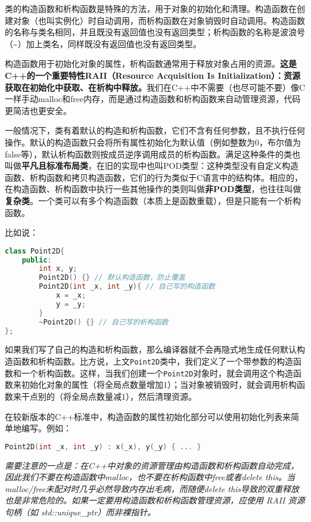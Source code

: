\documentclass[../main.tex]{subfiles}
\begin{document}
类的构造函数和析构函数是特殊的方法，用于对象的初始化和清理。构造函数在创建对象（也叫实例化）时自动调用，而析构函数在对象销毁时自动调用。构造函数的名称与类名相同，并且既没有返回值也没有返回类型；析构函数的名称是波浪号（\textasciitilde）加上类名，同样既没有返回值也没有返回类型。

构造函数用于初始化对象的属性，析构函数通常用于释放对象占用的资源。\textbf{这是C++的一个重要特性RAII（Resource Acquisition Is Initialization）：资源获取在初始化中获取、在析构中释放。}我们在C++中不需要（也尽可能不要）像C一样手动malloc和free内存，而是通过构造函数和析构函数来自动管理资源，代码更简洁也更安全。

一般情况下，类有着默认的构造和析构函数，它们不含有任何参数，且不执行任何操作。默认的构造函数只会将所有属性初始化为默认值（例如整数为0，布尔值为false等），默认析构函数则按成员逆序调用成员的析构函数。满足这种条件的类也叫做\textbf{平凡且标准布局类}，在旧的实现中也叫POD类型：这种类型没有自定义构造函数、析构函数和拷贝构造函数，它们的行为类似于C语言中的结构体。相应的，在构造函数、析构函数中执行一些其他操作的类则叫做\textbf{非POD类型}，也往往叫做\textbf{复杂类}。一个类可以有多个构造函数（本质上是函数重载），但是只能有一个析构函数。

比如说：
\begin{lstlisting}[language=C++]
class Point2D{
    public:
        int x, y;
        Point2D() {} // 默认构造函数，防止覆盖
        Point2D(int _x, int _y){ // 自己写的构造函数
            x = _x;
            y = _y;
        }
        ~Point2D() {} // 自己写的析构函数
};
\end{lstlisting}

如果我们写了自己的构造和析构函数，那么编译器就不会再隐式地生成任何默认构造函数和析构函数。比方说，上文\texttt{Point2D}类中，我们定义了一个带参数的构造函数和一个析构函数。这样，当我们创建一个\texttt{Point2D}对象时，就会调用这个构造函数来初始化对象的属性（将全局点数量增加1）；当对象被销毁时，就会调用析构函数来干点别的（将全局点数量减1），然后清理资源。

在较新版本的C++标准中，构造函数的属性初始化部分可以使用初始化列表来简单地编写。例如：
\begin{lstlisting}[language=C++]
Point2D(int _x, int _y) : x(_x), y(_y) { ... }
\end{lstlisting}

\emph{
  需要注意的一点是：在C++中对象的资源管理由构造函数和析构函数自动完成，因此我们不要在构造函数中malloc，也不要在析构函数中free或者delete this。当malloc/free未配对时几乎必然导致内存出毛病，而随便delete this导致的双重释放也是非常危险的。如果一定要用构造函数和析构函数管理资源，应使用 RAII 资源句柄（如 std::unique\_ptr）而非裸指针。
}
\end{document}
